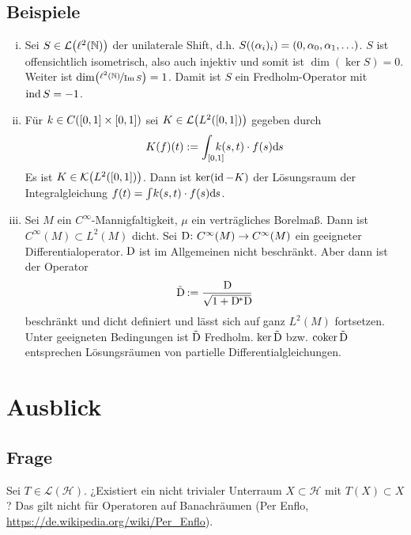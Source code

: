 \subsection{Beispiele} %
\label{sub:95}
\begin{enumerate}[(i)]
	\item Sei $S \in \mathcal{L}\enbrace*{\ell^2(\mathds{N})}$ der unilaterale Shift, d.h. 
	$S \enbrace*{(\alpha_i)_i}= (0, \alpha_0, \alpha_1, \ldots )$. $S$ ist offensichtlich isometrisch, also auch injektiv und somit ist $\dim (\ker S)=0$. Weiter ist
	$\dim \enbrace*{\nicefrac{\ell^2(\mathds{N})}{\im S}} =1$. Damit ist $S$ ein Fredholm-Operator mit $\operatorname{ind} S = -1$.
	\item Für $k \in C \enbrace*{[0,1] \times [0,1]}$ sei $K \in \mathcal{L} \enbrace*{L^2([0,1])}$ gegeben durch
	\[
		K(f)(t) := \int_{[0,1]}\hspace{-1em} k(s,t)\cdot f(s)\mathrm{d}\mkern-1.0mu s
	\]
	Es ist $K \in \mathcal{K} \enbrace*{L^2([0,1])}$. Dann ist $\ker(\operatorname{id}-K)$ der Lösungsraum der Integralgleichung $f(t)= \int \!k(s,t)\cdot f(s) \mathrm{d}\mkern-1.0mu s$.
	\item Sei $M$ ein $C^\infty$-Mannigfaltigkeit, $\mu$ ein verträgliches Borelmaß. Dann ist $C^\infty(M) \subset L^2(M)$ dicht. Sei $\mathrm{D}\mkern-1.5mu \colon C^\infty(M) \to C^\infty(M)$
	ein geeigneter Differentialoperator. $\mathrm{D}\mkern-1.5mu$ ist im Allgemeinen nicht beschränkt. Aber dann ist der Operator 
	\[
		\tilde{\mathrm{D}\mkern-1.5mu} := \frac{\mathrm{D}\mkern-1.5mu}{\sqrt{1+ \mathrm{D}\mkern-1.5mu^* \mathrm{D}\mkern-1.5mu}} 
	\]
	beschränkt und dicht definiert und lässt sich auf ganz $L^2(M)$ fortsetzen. Unter geeigneten Bedingungen ist $\tilde{\mathrm{D}\mkern-1.5mu}$ Fredholm. $\ker \tilde{\mathrm{D}\mkern-1.5mu}$ bzw. 
	$\operatorname{coker} \tilde{\mathrm{D}\mkern-1.5mu}$ entsprechen Lösungsräumen von partielle Differentialgleichungen.
\end{enumerate}
\newpage

\section{Ausblick} %
\label{sec:10}

\subsection{Frage} %
\label{sub:101}
Sei $T \in \mathcal{L}(\mathcal{H})$. ¿Existiert ein nicht trivialer Unterraum $X \subset \mathcal{H}$ mit $T(X) \subset X$? Das gilt nicht für Operatoren auf Banachräumen 
(Per Enflo, \url{https://de.wikipedia.org/wiki/Per_Enflo}).


